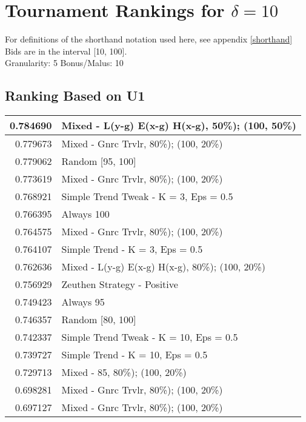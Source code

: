 \newpage  
\section{Tournament Rankings for $\delta = 10$}\label{results_10}
For definitions of the shorthand notation used here, see appendix \ref{shorthand} \\
\newline
Bids are in the interval [10, 100].\\
Granularity: 5\hspace{0.25in} Bonus/Malus: 10\\
\begin{table}[!hbtp]
\subsection{Ranking Based on U1}
\begin{footnotesize}
\begin{tabular}{|r|l|}\hline  \label{U3results}
0.784690 & Mixed - {L(y-g) E(x-g) H(x-g), 50\%); (100, 50\%)}\\ \hline
0.779673 & Mixed - {Gnrc Trvlr, 80\%); (100, 20\%)}\\ \hline
0.779062 & Random [95, 100]\\ \hline
0.773619 & Mixed - {Gnrc Trvlr, 80\%); (100, 20\%)}\\ \hline
0.768921 & Simple Trend Tweak - K = 3, Eps = 0.5\\ \hline
0.766395 & Always 100\\ \hline
0.764575 & Mixed - {Gnrc Trvlr, 80\%); (100, 20\%)}\\ \hline
0.764107 & Simple Trend - K = 3, Eps = 0.5\\ \hline
0.762636 & Mixed - {L(y-g) E(x-g) H(x-g), 80\%); (100, 20\%)}\\ \hline
0.756929 & Zeuthen Strategy - Positive\\ \hline
0.749423 & Always 95\\ \hline
0.746357 & Random [80, 100]\\ \hline
0.742337 & Simple Trend Tweak - K = 10, Eps = 0.5\\ \hline
0.739727 & Simple Trend - K = 10, Eps = 0.5\\ \hline
0.729713 & Mixed - {85, 80\%); (100, 20\%)}\\ \hline
0.698281 & Mixed - {Gnrc Trvlr, 80\%); (100, 20\%)}\\ \hline
0.697127 & Mixed - {Gnrc Trvlr, 80\%); (100, 20\%)}\\ \hline

\end{tabular}
\end{footnotesize}
\end{table}
